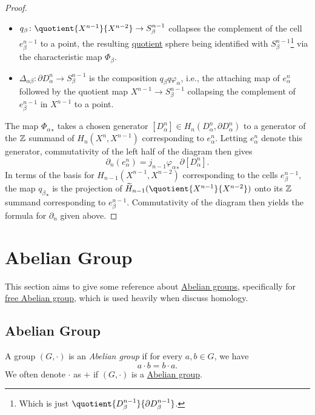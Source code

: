 \begin{proof}
\begin{itemize}
		\item \(q_\beta \colon \quotient{X^{n-1} }{X^{n-2} } \to S^{n-1}_\beta\) collapses the complement of the cell \(e^{n-1}_\beta\) to a point, the resulting
		      \hyperref[CW-complex-quotient]{quotient} sphere being identified with \(S^{n-1}_\beta\)\footnote{Which is just \(\quotient{D^{n-1}_\beta}{\partial D^{n-1}_\beta}\).}
		      via the characteristic map \(\Phi _\beta \).
		\item \(\Delta _{\alpha \beta }\colon \partial D^n_\alpha \to S^{n-1}_\beta\) is the composition \(q_\beta q \varphi _\alpha \), i.e., the
		      attaching map of \(e^n_\alpha \) followed by the quotient map \(X^{n-1}\to S^{n-1}_\beta\) collapsing the complement of \(e^{n-1}_\beta\)
		      in \(X^{n-1}\) to a point.
	\end{itemize}

	The map \({\Phi _\alpha }_\ast\) takes a chosen generator \([D^n_\alpha ]\in H_n(D^n_\alpha , \partial D^n_\alpha )\) to a generator of the \(\mathbb{\MakeUppercase{z}} \)
	summand of \(H_n(X^n, X^{n-1})\) corresponding to \(e^n_\alpha \). Letting \(e^n_\alpha \) denote this generator, commutativity of the left half
	of the diagram then gives
	\[
		\partial _n(e^n_\alpha )= j_{n-1}{\varphi _\alpha }_\ast\partial [D^n_\alpha ].
	\]
	In terms of the basis for \(H_{n-1}(X^{n-1}, X^{n-2} )\) corresponding to the cells \(e^{n-1}_\beta\), the map \({q_\beta }_\ast\) is the projection of
	\(\widetilde{H} _{n-1}(\quotient{X^{n-1} }{X^{n-2}})\) onto its \(\mathbb{\MakeUppercase{z}} \) summand corresponding to \(e^{n-1}_\beta\).
	Commutativity of the diagram then yields the formula for \(\partial _n\) given above.
\end{proof}

\section{Abelian Group}
This section aims to give some reference about \hyperref[def:Abelian-group]{Abelian groups}, specifically for \hyperref[def:free-Abelian-group]{free Abelian group}, which is used
heavily when discuss homology.
\subsection{Abelian Group}
\begin{definition}\label{def:Abelian-group}
	A group \((G, \cdot)\) is an \emph{Abelian group} if for every \(a, b\in G\), we have
	\[
		a\cdot b = b\cdot a.
	\]
	We often denote \(\cdot\) as \(+\) if \((G, \cdot)\) is a \hyperref[def:Abelian-group]{Abelian group}.
\end{definition}

